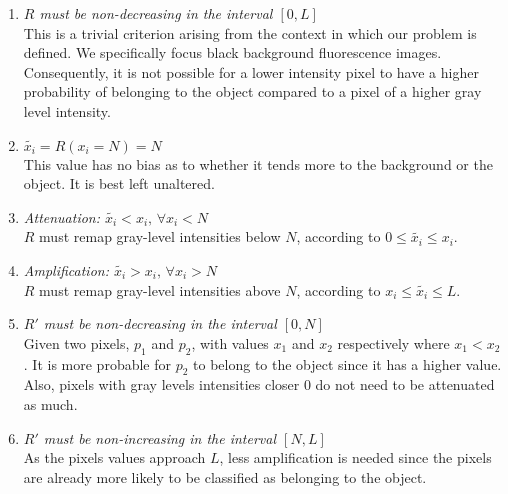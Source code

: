 \begin{enumerate}
	\item{}
	\textit{$R$ must be non-decreasing in the interval $[0, L]$}\\
	This is a trivial criterion arising from the context in which our problem is defined. We specifically focus black background fluorescence images. Consequently, it is not possible for a lower intensity pixel to have a higher probability of belonging to the object compared to a pixel of a higher gray level intensity. 
	
	\item
	\textit{$\widetilde{x_i} = R(x_i=N) = N$}\\
	This value has no bias as to whether it tends more to the background or the object. It is best left unaltered.
	
	\item
	\textit{Attenuation: $\widetilde{x_i} < x_i, \, \forall x_i<N$}\\
	$R$ must remap gray-level intensities below $N$, according to $0 \leq \widetilde{x_i} \leq x_i$.
	
	\item
	\textit{Amplification: $\widetilde{x_i} > x_i, \, \forall x_i>N$}\\
	$R$ must remap gray-level intensities above $N$, according to $x_i \leq \widetilde{x_i} \leq L$.
	
	\item
	\textit{$R'$ must be non-decreasing in the interval $[0,N]$}\\
	Given two pixels, $p_1$ and $p_2$, with values $x_1$ and $x_2$ respectively where $x_1<x_2$. It is more probable for $p_2$ to belong to the object since it has a higher value. Also, pixels with gray levels intensities closer $0$ do not need to be attenuated as much.
	
	\item
	\textit{$R'$ must be non-increasing in the interval $[N,L]$}\\
	As the pixels values approach $L$, less amplification is needed since the pixels are already more likely to be classified as belonging to the object.
\end{enumerate}

